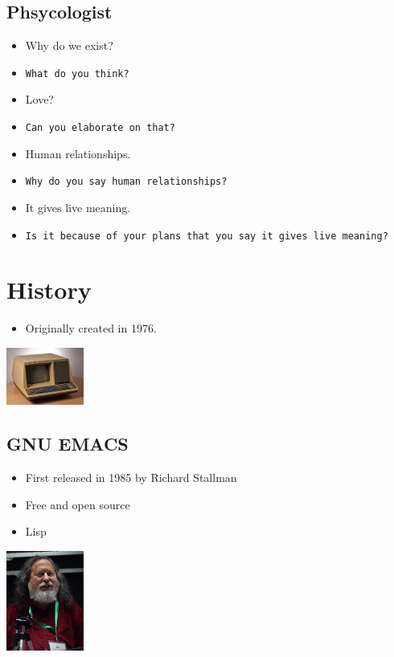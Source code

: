 \documentclass[11pt]{article}
\begin{document}
\subsection*{Phsycologist}
\label{sec:org2591db7}
\begin{itemize}
\item Why do we exist?
\item \texttt{What do you think?}
\item Love?
\item \texttt{Can you elaborate on that?}
\item Human relationships.
\item \texttt{Why do you say human relationships?}
\item It gives live meaning.
\item \texttt{Is it because of your plans that you say it gives live meaning?}
\end{itemize}


\section*{History}
\label{sec:org7115a6a}
\begin{itemize}
\item Originally created in 1976.
\end{itemize}
\begin{center}
\includegraphics[width=1in]{terminal.jpg}
\end{center}
\subsection*{GNU EMACS}
\label{sec:org60c1346}
\begin{itemize}
\item First released in 1985 by Richard Stallman
\item Free and open source
\item Lisp
\end{itemize}
\begin{center}
\includegraphics[width=1in]{Stallman.jpg}
\end{center}
\end{document}
